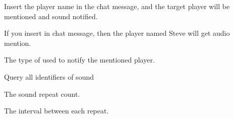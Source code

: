 Insert the player name in the chat message, and the target player will be mentioned and sound notified.

\begin{Configuration}
    \item[mention\_player]{
        \label{itm:mention_player}
        If you insert  in chat message, then the player named Steve will get audio mention.

        \begin{NestedList}
            \item[sound]{
                The type of  used to notify the mentioned player.
                \begin{tips}{Query all identifiers of sound}
                \end{tips}
            }

            \item[volume]
            \item[pitch]
            \item[repeat\_count]{
                The sound repeat count.
            }

            \item[interval\_ms]{
                The interval between each repeat.
            }
        \end{NestedList}

    }
\end{Configuration}
